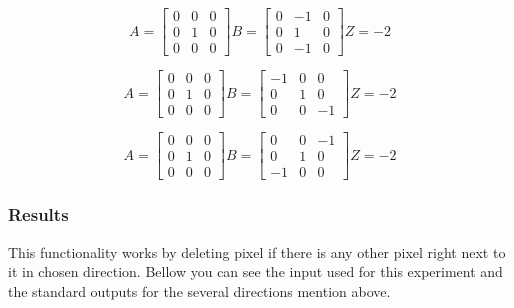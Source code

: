 \begin{minipage}{1\linewidth}
\begin{equation}
A =
\begin{bmatrix}
 0 & 0 & 0 \\
 0 & 1 & 0 \\
 0 & 0 & 0
\end{bmatrix}
B =
\begin{bmatrix}
 0 & -1 & 0 \\
 0 & 1 & 0 \\
 0 & -1 & 0
\end{bmatrix}
Z = -2
\end{equation}
\end{minipage}
\begin{minipage}{1\linewidth}
\begin{equation}
A =
\begin{bmatrix}
 0 & 0 & 0 \\
 0 & 1 & 0 \\
 0 & 0 & 0
\end{bmatrix}
B =
\begin{bmatrix}
 -1 & 0 & 0 \\
 0 & 1 & 0 \\
 0 & 0 & -1
\end{bmatrix}
Z = -2 
\end{equation}
\end{minipage}
\begin{minipage}{1\linewidth}
\begin{equation}
A =
\begin{bmatrix}
 0 & 0 & 0 \\
 0 & 1 & 0 \\
 0 & 0 & 0
\end{bmatrix}
B =
\begin{bmatrix}
 0 & 0 & -1 \\
 0 & 1 & 0 \\
 -1 & 0 & 0
\end{bmatrix}
Z = -2
\end{equation}
\end{minipage}
\subsubsection{Results}
This functionality works by deleting pixel if there is any other pixel right next to it in chosen direction. Bellow you can see the input used for this experiment and the standard outputs for the several directions mention above.

